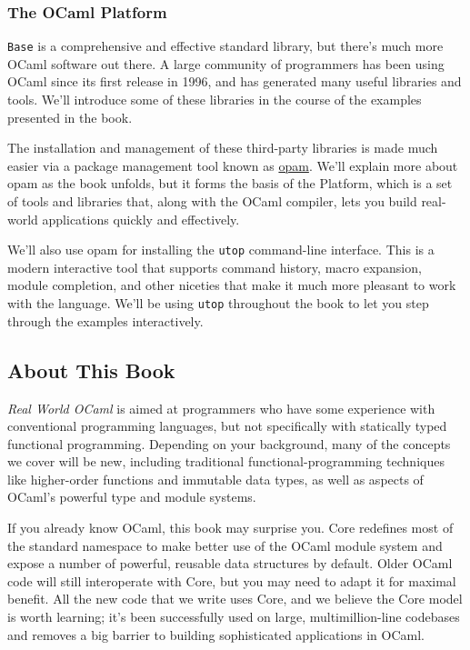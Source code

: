 \hypertarget{the-ocaml-platform}{%
\subsubsection{The OCaml Platform}\label{the-ocaml-platform}}

\passthrough{\lstinline!Base!} is a comprehensive and effective standard
library, but there's much more OCaml software out there. A large
community of programmers has been using OCaml since its first release in
1996, and has generated many useful libraries and tools. We'll introduce
some of these libraries in the course of the examples presented in the
book.

The installation and management of these third-party libraries is made
much easier via a package management tool known as
\href{http://opam.ocaml.org/}{opam}. We'll explain more about opam as
the book unfolds, but it forms the basis of the Platform, which is a set
of tools and libraries that, along with the OCaml compiler, lets you
build real-world applications quickly and effectively.

We'll also use opam for installing the \passthrough{\lstinline!utop!}
command-line interface. This is a modern interactive tool that supports
command history, macro expansion, module completion, and other niceties
that make it much more pleasant to work with the language. We'll be
using \passthrough{\lstinline!utop!} throughout the book to let you step
through the examples interactively.

\hypertarget{about-this-book}{%
\subsection{About This Book}\label{about-this-book}}

\emph{Real World OCaml} is aimed at programmers who have some experience
with conventional programming languages, but not specifically with
statically typed functional programming. Depending on your background,
many of the concepts we cover will be new, including traditional
functional-programming techniques like higher-order functions and
immutable data types, as well as aspects of OCaml's powerful type and
module systems.

If you already know OCaml, this book may surprise you. Core redefines
most of the standard namespace to make better use of the OCaml module
system and expose a number of powerful, reusable data structures by
default. Older OCaml code will still interoperate with Core, but you may
need to adapt it for maximal benefit. All the new code that we write
uses Core, and we believe the Core model is worth learning; it's been
successfully used on large, multimillion-line codebases and removes a
big barrier to building sophisticated applications in OCaml.


